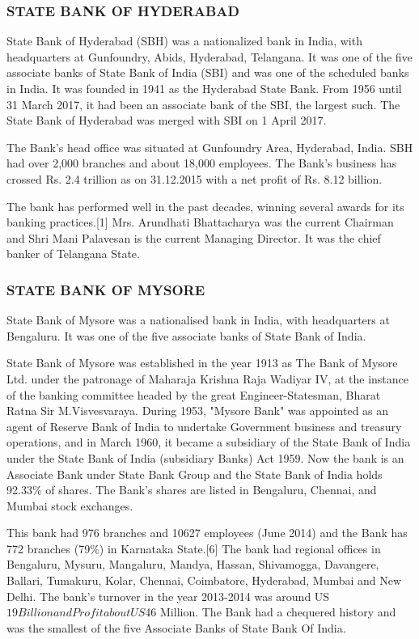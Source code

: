\documentclass[a4paper, 12pt]{extarticle}
\begin{document}
{\subsubsection{STATE BANK OF HYDERABAD}
State Bank of Hyderabad (SBH) was a nationalized bank in India, with headquarters at Gunfoundry, Abids, Hyderabad, Telangana. It was one of the five associate banks of State Bank of India (SBI) and was one of the scheduled banks in India. It was founded in 1941 as the Hyderabad State Bank. From 1956 until 31 March 2017, it had been an associate bank of the SBI, the largest such. The State Bank of Hyderabad was merged with SBI on 1 April 2017.

The Bank's head office was situated at Gunfoundry Area, Hyderabad, India. SBH had over 2,000 branches and about 18,000 employees. The Bank's business has crossed Rs. 2.4 trillion as on 31.12.2015 with a net profit of Rs. 8.12 billion.

The bank has performed well in the past decades, winning several awards for its banking practices.[1] Mrs. Arundhati Bhattacharya was the current Chairman and Shri Mani Palavesan is the current Managing Director. It was the chief banker of Telangana State.

\subsubsection{STATE BANK OF MYSORE}
State Bank of Mysore was a nationalised bank in India, with headquarters at Bengaluru. It was one of the five associate banks of State Bank of India.

State Bank of Mysore was established in the year 1913 as The Bank of Mysore Ltd. under the patronage of Maharaja Krishna Raja Wadiyar IV, at the instance of the banking committee headed by the great Engineer-Statesman, Bharat Ratna Sir M.Visvesvaraya. During 1953, "Mysore Bank" was appointed as an agent of Reserve Bank of India to undertake Government business and treasury operations, and in March 1960, it became a subsidiary of the State Bank of India under the State Bank of India (subsidiary Banks) Act 1959. Now the bank is an Associate Bank under State Bank Group and the State Bank of India holds 92.33\% of shares. The Bank's shares are listed in Bengaluru, Chennai, and Mumbai stock exchanges.

This bank had 976 branches and 10627 employees (June 2014) and the Bank has 772 branches (79\%) in Karnataka State.[6] The bank had regional offices in Bengaluru, Mysuru, Mangaluru, Mandya, Hassan, Shivamogga, Davangere, Ballari, Tumakuru, Kolar, Chennai, Coimbatore, Hyderabad, Mumbai and New Delhi. The bank's turnover in the year 2013-2014 was around US$19 Billion and Profit about US$46 Million. The Bank had a chequered history and was the smallest of the five Associate Banks of State Bank Of India.

}
\end{document}
